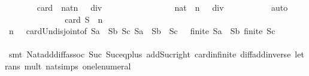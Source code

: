 \begin{isabellebody}
\isanewline
\isanewline
\ \ \ \ \ \ \isamarkupfalse%
\ {\isachardoublequoteopen}card\ {\isacharbraceleft}{}{\isacharcomma}\ {\isacharparenleft}{\isacharparenleft}{}{\isacharcolon}{\isacharcolon}nat{\isacharparenright}{\isacharcircum}n\ {\isacharplus}\ {}{\isacharparenright}\ div\ {}\ {\isacharminus}\ {}{\isacharbraceright}\ {\isacharequal}\ {}{\isachardoublequoteclose}\isanewline
\ \ \ \ \ \ \ \ \isamarkupfalse%
\ {\isacharbackquoteopen}{}\ {\isacharless}\ {\isacharparenleft}{\isacharparenleft}{}{\isacharcolon}{\isacharcolon}nat{\isacharparenright}\ {\isacharcircum}\ n\ {\isacharplus}\ {}{\isacharparenright}\ div\ {}{\isacharbackquoteclose}\isanewline
\ \ \ \ \ \ \ \ \isamarkupfalse%
\ auto\isanewline
\isanewline
\ \ \ \ \ \ \isamarkupfalse%
\isanewline
\isanewline
\ \ \ \ \ \ \isamarkupfalse%
\ {\isachardoublequoteopen}card\ {\isacharquery}S\ {\isacharequal}\ {}{\isacharasterisk}n{\isachardoublequoteclose}\isanewline
\ \ \ \ \ \ \ \ \isamarkupfalse%
\ {\isacharbackquoteopen}n\ {\isasymge}\ {}{\isacharbackquoteclose}\ card{\isacharunderscore}Un{\isacharunderscore}disjoint{\isacharbrackleft}of\ {\isachardoublequoteopen}{\isacharquery}Sa\ {\isasymunion}\ {\isacharquery}Sb{\isachardoublequoteclose}\ {\isacharquery}Sc{\isacharbrackright}\ {\isacharbackquoteopen}{\isacharparenleft}{\isacharquery}Sa\ {\isasymunion}\ {\isacharquery}Sb{\isacharparenright}\ {\isasyminter}\ {\isacharquery}Sc\ {\isacharequal}\ {\isacharbraceleft}{\isacharbraceright}{\isacharbackquoteclose}\ {\isacharbackquoteopen}finite\ {\isacharparenleft}{\isacharquery}Sa\ {\isasymunion}\ {\isacharquery}Sb{\isacharparenright}{\isacharbackquoteclose}\ {\isacharbackquoteopen}finite\ {\isacharquery}Sc{\isacharbackquoteclose}\isanewline
\ \ \ \ \ \ \ \ \isamarkupfalse%
\ {\isacharparenleft}smt\ Nat{\isachardot}add{\isacharunderscore}diff{\isacharunderscore}assoc{}\ Suc{\isacharunderscore}{}\ Suc{\isacharunderscore}eq{\isacharunderscore}plus{}\ add{\isacharunderscore}Suc{\isacharunderscore}right\ card{\isacharunderscore}infinite\ diff{\isacharunderscore}add{\isacharunderscore}inverse{}\ le{\isacharunderscore}trans\ mult{\isacharunderscore}{}\ nat{\isachardot}simps{\isacharparenleft}{}{\isacharparenright}\ one{\isacharunderscore}le{\isacharunderscore}numeral{\isacharparenright}\isanewline

\end{isabellebody}
